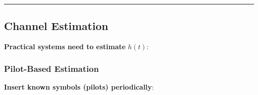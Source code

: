 \begin{Shaded}
\begin{Highlighting}[]
\OperatorTok{=}\NormalTok{)}
\NormalTok{)}
\NormalTok{)}
\NormalTok{)}
\NormalTok{)}
\end{Highlighting}
\end{Shaded}

\begin{center}\rule{0.5\linewidth}{0.5pt}\end{center}

\subsection{Channel Estimation}\label{channel-estimation}

\textbf{Practical systems need to estimate} \(h(t)\):

\subsubsection{Pilot-Based Estimation}\label{pilot-based-estimation}

\textbf{Insert known symbols (pilots) periodically}:


